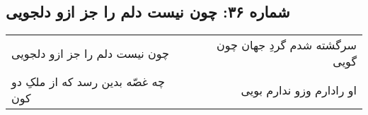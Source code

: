 \begin{center}
\section*{شماره ۳۶: چون نیست دلم را جز ازو دلجویی}
\label{sec:036}
\begin{longtable}{l p{0.5cm} r}
چون نیست دلم را جز ازو دلجویی
&&
سرگشته شدم گردِ جهان چون گویی
\\
چه غصّه بدین رسد که از ملکِ دو کون
&&
او رادارم وزو ندارم بویی
\\
\end{longtable}
\end{center}
